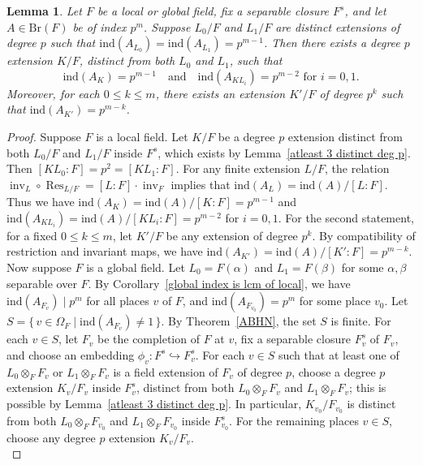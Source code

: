 \documentclass[10pt]{amsart}
\theoremstyle{plain}
\newtheorem{lemma}[thm]{Lemma}
\theoremstyle{definition}
\newcommand{\Br}{\text{Br}}
\begin{document}
\begin{lemma}\label{local-global}
Let \(F\) be a local or global field, fix a separable closure \(F^s\), and let \(A \in \Br(F)\) be of index \(p^m\). Suppose \(L_0/F\) and \(L_1/F\) are distinct extensions of degree \(p\) such that \(\mathrm{ind}(A_{L_0})=\mathrm{ind}(A_{L_1})=p^{m-1}\). Then there exists a degree \(p\) extension \(K/F\), distinct from both \(L_0\) and \(L_1\), such that
\[
\mathrm{ind}(A_K)=p^{m-1} \quad \text{and} \quad \mathrm{ind}(A_{K L_i})=p^{m-2} \text{ for } i=0,1.
\]
Moreover, for each \(0 \le k \le m\), there exists an extension \(K'/F\) of degree \(p^k\) such that \(\mathrm{ind}(A_{K'}) = p^{m-k}\).
\end{lemma}

\begin{proof}
Suppose \(F\) is a local field. Let \(K/F\) be a degree \(p\) extension distinct from both \(L_0/F\) and \(L_1/F\) inside \(F^s\), which exists by Lemma~\ref{atleast 3 distinct deg p}. Then \([KL_0:F]=p^2=[KL_1:F]\). For any finite extension \(L/F\), the relation \(\operatorname{inv}_L \circ \operatorname{Res}_{L/F} = [L:F]\cdot \operatorname{inv}_F\) implies that \(\mathrm{ind}(A_L) = \mathrm{ind}(A)/[L:F]\). Thus we have \(\mathrm{ind}(A_K)= \mathrm{ind}(A)/[K:F]=p^{m-1}\) and \(\mathrm{ind}(A_{K L_i})= \mathrm{ind}(A)/[KL_i:F]= p^{m-2}\) for \(i=0,1\). For the second statement, for a fixed \(0 \le k \le m\), let \(K'/F\) be any extension of degree \(p^k\). By compatibility of restriction and invariant maps, we have \(\mathrm{ind}(A_{K'}) = \mathrm{ind}(A)/[K':F]=p^{m-k}\).\\
Now suppose \(F\) is a global field. Let \(L_0=F(\alpha)\) and \(L_1=F(\beta)\) for some \(\alpha,\beta\) separable over \(F\). By Corollary~\ref{global index is lcm of local}, we have \(\mathrm{ind}(A_{F_v}) \mid p^m\) for all places \(v\) of \(F\), and \(\mathrm{ind}(A_{F_{v_0}})=p^m\) for some place \(v_0\). Let \(S=\{\, v \in \Omega_F \mid \mathrm{ind}(A_{F_v}) \neq 1 \,\}\). By Theorem~\ref{ABHN}, the set \(S\) is finite. For each \(v \in S\), let \(F_{v}\) be the completion of \(F\) at \(v\), fix a separable closure \(F_{v}^s\) of \(F_{v}\), and choose an embedding \(\phi_v : F^s \hookrightarrow F_{v}^s\). For each \(v \in S\) such that at least one of \(L_0 \otimes_F F_v\) or \(L_1 \otimes_F F_v\) is a field extension of \(F_v\) of degree \(p\), choose a degree \(p\) extension \(K_v/F_v\) inside \(F_v^s\), distinct from both \(L_0 \otimes_F F_v\) and \(L_1 \otimes_F F_v\); this is possible by Lemma~\ref{atleast 3 distinct deg p}. In particular, \(K_{v_0}/F_{v_0}\) is distinct from both \(L_0 \otimes_F F_{v_0}\) and \(L_1 \otimes_F F_{v_0}\) inside \(F_{v_0}^s\). For the remaining places \(v \in S\), choose any degree \(p\) extension \(K_v/F_v\).\\

\end{proof}
\end{document}

